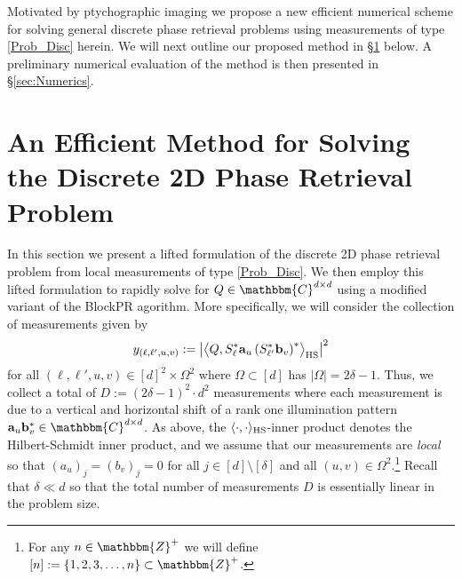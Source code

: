 \documentclass[]{spie}  %
\def \a {\mathbf a}
\def \b {\mathbf b}
\begin{document}
Motivated by ptychographic imaging we propose a new efficient numerical scheme for solving general discrete phase retrieval problems using measurements of type \eqref{Prob_Disc} herein.  We will next outline our proposed method in \S\ref{sec:TheMethod} below.  A preliminary numerical evaluation of the method is then presented in \S\ref{sec:Numerics}.

\section{An Efficient Method for Solving the Discrete 2D Phase Retrieval Problem}
\label{sec:TheMethod}

In this section we present a lifted formulation\cite{candes2013phaselift} of the discrete 2D phase retrieval problem from local measurements of type \eqref{Prob_Disc}.  We then employ this lifted formulation to rapidly solve for $Q \in \mathbbm{C}^{d \times d}$ using a modified variant of the BlockPR agorithm\cite{iwen2016fast,iwen2016phase}.  More specifically, we will consider the collection of measurements given by 
\begin{equation}
y_{(\ell,\ell',u,v)} := \left| \left\langle Q, S^*_{\ell} \a_u \left(S^*_{\ell'} \b_v \right)^* \right\rangle_{\rm HS} \right|^2
\label{def:Measurements}
\end{equation}
for all $(\ell,\ell',u,v) \in [d]^2 \times\Omega^2$ where $\Omega \subset [d]$ has $|\Omega| = 2\delta-1$.  Thus, we collect a total of $D := (2\delta-1)^2 \cdot d^2 $ measurements where each measurement is due to a vertical and horizontal shift of a rank one illumination pattern $\a_u \b_v^* \in \mathbbm{C}^{d \times d}$.  As above, the $\langle \cdot,\cdot \rangle_{\rm HS}$-inner product denotes the Hilbert-Schmidt inner product, and we assume that our measurements are {\it local} so that $\left(a_u\right)_j = \left(b_v \right)_j = 0$ for all $j \in [d] \setminus [\delta]$ and all $(u,v) \in \Omega^2$.\footnote{For any $n \in \mathbbm{Z}^+$ we will define $[n] := \{ 1, 2, 3, \dots, n \} \subset \mathbbm{Z}^+$.}  Recall that $\delta \ll d$ so that the total number of measurements $D$ is essentially linear in the problem size.
\end{document}
